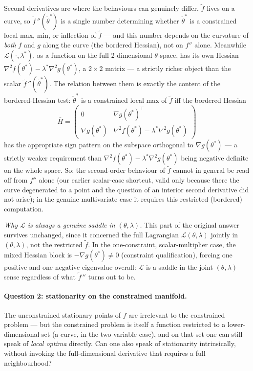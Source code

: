 \documentclass[a4paper,oneside,12pt]{extarticle}
\theoremstyle{plain}
\theoremstyle{definition}
\theoremstyle{remark}
\begin{document}
Second derivatives are where the behaviours can genuinely differ.
$\tilde f$ lives on a curve, so $\tilde f\,''(\tilde\theta^*)$ is a
single number determining whether $\tilde\theta^*$ is a constrained
local max, min, or inflection of $\tilde f$ --- and this number
depends on the curvature of \emph{both} $f$ and $g$ along the curve
(the bordered Hessian), not on $f''$ alone.  Meanwhile
$\mathcal{L}(\cdot,\lambda^*)$, as a function on the full
2-dimensional $\theta$-space, has its own Hessian
$\nabla^2 f(\theta^*) - \lambda^*\nabla^2 g(\theta^*)$, a $2\times 2$
matrix --- a strictly richer object than the scalar
$\tilde f\,''(\tilde\theta^*)$.  The relation between them is exactly
the content of the bordered-Hessian test: $\tilde\theta^*$ is a
constrained local max of $\tilde f$ iff the bordered Hessian
\[
  \bar H = \begin{pmatrix} 0 & \nabla g(\theta^*)^\top \\
  \nabla g(\theta^*) & \nabla^2 f(\theta^*)-\lambda^*\nabla^2 g(\theta^*)
  \end{pmatrix}
\]
has the appropriate sign pattern on the subspace orthogonal to
$\nabla g(\theta^*)$ --- a strictly weaker requirement than
$\nabla^2 f(\theta^*)-\lambda^*\nabla^2g(\theta^*)$ being negative
definite on the whole space.  So: the second-order behaviour of
$\tilde f$ cannot in general be read off from $f''$ alone (our
earlier scalar-case shortcut, valid only because there the curve
degenerated to a point and the question of an interior second
derivative did not arise); in the genuine multivariate case it
requires this restricted (bordered) computation.

\emph{Why $\mathcal{L}$ is always a genuine saddle in $(\theta,\lambda)$.}
This part of the original answer survives unchanged, since it
concerned the full Lagrangian $\mathcal{L}(\theta,\lambda)$ jointly
in $(\theta,\lambda)$, not the restricted $\tilde f$.  In the
one-constraint, scalar-multiplier case, the mixed Hessian block is
$-\nabla g(\theta^*)\ne 0$ (constraint qualification), forcing one
positive and one negative eigenvalue overall: $\mathcal{L}$ is a
saddle in the joint $(\theta,\lambda)$ sense regardless of what
$\tilde f\,''$ turns out to be.

\paragraph{Question 2: stationarity on the constrained manifold.}
The unconstrained stationary points of $f$ are irrelevant to the
constrained problem --- but the constrained problem is itself a
function restricted to a lower-dimensional set (a curve, in the
two-variable case), and on that set one can still speak of
\emph{local optima} directly.  Can one also speak of stationarity
intrinsically, without invoking the full-dimensional derivative
that requires a full neighbourhood?
\end{document}
